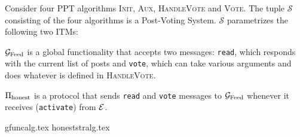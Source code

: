 \begin{definition}
  \label{model:def:pvs}
  Consider four PPT algorithms \textsc{Init}, \textsc{Aux},
  \textsc{HandleVote} and \textsc{Vote}. The tuple $\mathcal{S}$ consisting
  of the four algorithms is a Post-Voting System. $\mathcal{S}$ parametrizes the
  following two ITMs:

  $\mathcal{G}_{\mathrm{Feed}}$ is a global functionality that accepts two messages: \texttt{read},
  which responds with the current list of posts and \texttt{vote}, which can
  take various arguments and does whatever is defined in \textsc{HandleVote}.

  $\Pi_{\mathrm{honest}}$ is a protocol that sends \texttt{read} and \texttt{vote}
  messages to $\mathcal{G}_{\mathrm{Feed}}$ whenever it receives (\texttt{activate}) from $\mathcal{E}$.
\end{definition}
{gfuncalg.tex}
{honeststralg.tex}
